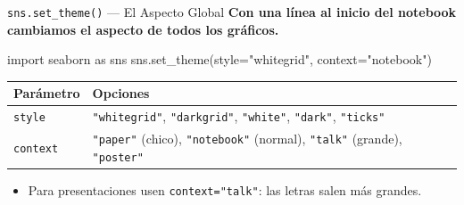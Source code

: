 \documentclass[aspectratio=169, 11pt]{beamer}
\begin{document}
\begin{frame}[fragile,shrink=28]{\texttt{sns.set\_theme()} --- El Aspecto Global}
  \vspace{-6pt}
  {\footnotesize\color{arcaDark}\bfseries
    Con una línea al inicio del notebook cambiamos el aspecto
    de \textbf{todos} los gráficos.}

  \vspace{4pt}
  \begin{pyblock}
import seaborn as sns
sns.set_theme(style="whitegrid", context="notebook")
  \end{pyblock}

  \vspace{4pt}
  {\scriptsize
  \begin{tabular}{@{}lp{8cm}@{}}
    \toprule
    \textbf{Parámetro} & \textbf{Opciones} \\
    \midrule
    \texttt{style} & \texttt{"whitegrid"}, \texttt{"darkgrid"},
      \texttt{"white"}, \texttt{"dark"}, \texttt{"ticks"} \\
    \texttt{context} & \texttt{"paper"} (chico), \texttt{"notebook"}
      (normal), \texttt{"talk"} (grande), \texttt{"poster"} \\
    \bottomrule
  \end{tabular}
  }

  \vspace{4pt}
  {\scriptsize\color{textMuted}
  \begin{itemize}\setlength{\itemsep}{3pt}
    \item[{\color{arcaRed}\scriptsize\faLightbulb}]
      Para presentaciones usen \texttt{context="talk"}: las letras
      salen más grandes.
  \end{itemize}
  }
\end{frame}
\end{document}
